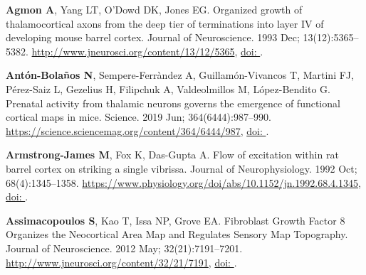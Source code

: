 \documentclass[9pt,lineno]{elife}
\begin{document}
\begin{thebibliography}{31}
\providecommand{\natexlab}[1]{#1}
\providecommand{\urlprefix}{}
\providecommand{\doiprefix}{doi: }

\textbf{\color{eLifeMediumGrey} Agmon A}, Yang LT, O'Dowd DK, Jones EG.
\newblock Organized growth of thalamocortical axons from the deep tier of
  terminations into layer {IV} of developing mouse barrel cortex.
\newblock Journal of Neuroscience.  1993 Dec; 13(12):5365--5382.
\newblock \urlprefix\url{http://www.jneurosci.org/content/13/12/5365},
  \href{10.1523/JNEUROSCI.13-12-05365.1993}{\doiprefix
  }.

\textbf{\color{eLifeMediumGrey} Ant{\'o}n-Bola{\~n}os N}, Sempere-Ferr{\`a}ndez
  A, Guillam{\'o}n-Vivancos T, Martini FJ, P{\'e}rez-Saiz L, Gezelius H,
  Filipchuk A, Valdeolmillos M, L{\'o}pez-Bendito G.
\newblock Prenatal activity from thalamic neurons governs the emergence of
  functional cortical maps in mice.
\newblock Science.  2019 Jun; 364(6444):987--990.
\newblock \urlprefix\url{https://science.sciencemag.org/content/364/6444/987},
  \href{10.1126/science.aav7617}{\doiprefix
  }.

\textbf{\color{eLifeMediumGrey} Armstrong-James M}, Fox K, Das-Gupta A.
\newblock Flow of excitation within rat barrel cortex on striking a single
  vibrissa.
\newblock Journal of Neurophysiology.  1992 Oct; 68(4):1345--1358.
\newblock
  \urlprefix\url{https://www.physiology.org/doi/abs/10.1152/jn.1992.68.4.1345},
  \href{10.1152/jn.1992.68.4.1345}{\doiprefix
  }.

\textbf{\color{eLifeMediumGrey} Assimacopoulos S}, Kao T, Issa NP, Grove EA.
\newblock Fibroblast {Growth} {Factor} 8 {Organizes} the {Neocortical} {Area}
  {Map} and {Regulates} {Sensory} {Map} {Topography}.
\newblock Journal of Neuroscience.  2012 May; 32(21):7191--7201.
\newblock \urlprefix\url{http://www.jneurosci.org/content/32/21/7191},
  \href{10.1523/JNEUROSCI.0071-12.2012}{\doiprefix
  }.


\end{thebibliography}
\end{document}
